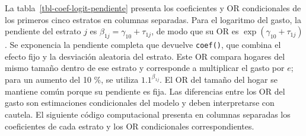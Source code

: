 \documentclass[
  spanish,
  11pt,
  letterpaper,
  oneside,
  open=any]{scrbook}
\newenvironment{Shaded}{\begin{snugshade}}{\end{snugshade}}
\newcommand{\AttributeTok}[1]{\textcolor[rgb]{0.40,0.45,0.13}{#1}}
\newcommand{\DecValTok}[1]{\textcolor[rgb]{0.68,0.00,0.00}{#1}}
\newcommand{\FunctionTok}[1]{\textcolor[rgb]{0.28,0.35,0.67}{#1}}
\newcommand{\NormalTok}[1]{\textcolor[rgb]{0.00,0.23,0.31}{#1}}
\newcommand{\OtherTok}[1]{\textcolor[rgb]{0.00,0.23,0.31}{#1}}
\newcommand{\SpecialCharTok}[1]{\textcolor[rgb]{0.37,0.37,0.37}{#1}}
\newcommand{\StringTok}[1]{\textcolor[rgb]{0.13,0.47,0.30}{#1}}
\begin{document}
La tabla~\ref{tbl-coef-logit-pendiente} presenta los coeficientes y OR
condicionales de los primeros cinco estratos en columnas separadas. Para
el logaritmo del gasto, la pendiente del estrato \(j\) es
\(\beta_{1j}=\gamma_{10}+\tau_{1j}\), de modo que su OR es
\(\exp(\gamma_{10}+\tau_{1j})\). Se exponencia la pendiente completa que
devuelve \texttt{coef()}, que combina el efecto fijo y la desviación
aleatoria del estrato. Este OR compara hogares del mismo tamaño dentro
de ese estrato y corresponde a multiplicar el gasto por \(e\); para un
aumento del 10 \%, se utiliza \(1.1^{\beta_{1j}}\). El OR del tamaño del
hogar se mantiene común porque su pendiente es fija. Las diferencias
entre los OR del gasto son estimaciones condicionales del modelo y deben
interpretarse con cautela. El siguiente código computacional presenta en
columnas separadas los coeficientes de cada estrato y los OR
condicionales correspondientes.

\begin{Shaded}
\end{Shaded}
\end{document}
